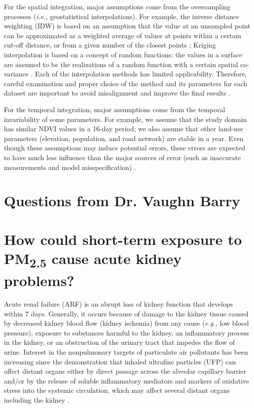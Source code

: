 \documentclass[11pt]{article}
\newcommand{\tsub}{\textsubscript}
\begin{document}
\begin{enumerate*}[{[a)]}]
{    \item For the spatial integration, major assumptions come from the oversampling processes (\textit{i.e.,} geostatistical interpolations). For example, the inverse distance weighting (IDW) is based on an assumption that the value at an unsampled point can be approximated as a weighted average of values at points within a certain cut-off distance, or from a given number of the closest points \citep{bartier1996multivariate}; Kriging interpolation is based on a concept of random functions: the values in a surface are assumed to be the realizations of a random function with a certain spatial co-variance \citep{oliver1990kriging}. Each of the interpolation methods has limited applicability. Therefore, careful examination and proper choice of the method and its parameters for each dataset are important to avoid misalignment and improve the final results \citep{mitas1999spatial}.
    
    For the temporal integration, major assumptions come from the temporal invariability of some parameters. For example, we assume that the study domain has similar NDVI values in a 16-day period; we also assume that other land-use parameters (elevation, population, and road network) are stable in a year. Even though these assumptions may induce potential errors, these errors are expected to have much less influence than the major sources of error (such as inaccurate measurements and model misspecification) \citep{xiao2017full}.
    }
\end{enumerate*}



\hdashrule{\textwidth}{0.1pt}{0.6mm 0.6mm}
\setcounter{section}{0}

\section*{Questions from Dr. Vaughn Barry}

\section{How could short-term exposure to \texorpdfstring{PM\tsub{2.5}}{PM2.5} cause acute kidney problems?}
Acute renal failure (ARF) is an abrupt loss of kidney function that develops within 7 days. Generally, it occurs because of damage to the kidney tissue caused by decreased kidney blood flow (kidney ischemia) from any cause (\textit{e.g.,} low blood pressure), exposure to substances harmful to the kidney, an inflammatory process in the kidney, or an obstruction of the urinary tract that impedes the flow of urine. Interest in the nonpulmonary targets of particulate air pollutants has been increasing since the demonstration that inhaled ultrafine particles (UFP) can affect distant organs either by direct passage across the alveolar capillary barrier and/or by the release of soluble inflammatory mediators and markers of oxidative stress into the systemic circulation, which may affect several distant organs including the kidney \citep{nemmar2004possible, oberdorster2005nanotoxicology, peters2006translocation, vermylen2005ambient, nemmar2013recent}. 
\end{document}
